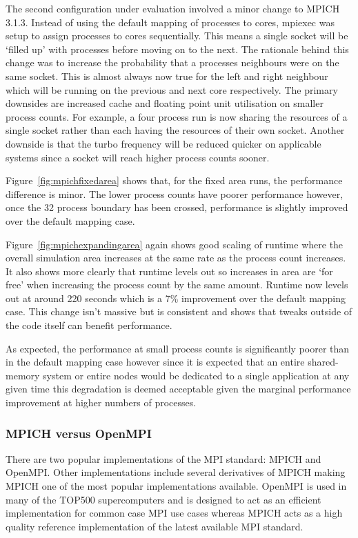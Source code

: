 The second configuration under evaluation involved a minor change to MPICH
3.1.3. Instead of using the default mapping of processes to cores, mpiexec was
setup to assign processes to cores sequentially. This means a single socket will
be `filled up' with processes before moving on to the next. The rationale behind
this change was to increase the probability that a processes neighbours were on
the same socket. This is almost always now true for the left and right neighbour
which will be running on the previous and next core respectively. The primary
downsides are increased cache and floating point unit utilisation on smaller
process counts. For example, a four process run is now sharing the resources of
a single socket rather than each having the resources of their own socket.
Another downside is that the turbo frequency will be reduced quicker on
applicable systems since a socket will reach higher process counts sooner.

Figure~\ref{fig:mpichfixedarea} shows that, for the fixed area runs, the
performance difference is minor. The lower process counts have poorer
performance however, once the 32 process boundary has been crossed, performance
is slightly improved over the default mapping case.

Figure~\ref{fig:mpichexpandingarea} again shows good scaling of
runtime where the overall simulation area increases at the same rate as the
process count increases. It also shows more clearly that runtime levels out so
increases in area are `for free' when increasing the process count by the same
amount. Runtime now levels out at around 220 seconds which is a 7\% improvement
over the default mapping case. This change isn't massive but is consistent and
shows that tweaks outside of the code itself can benefit performance.

As expected, the performance at small process counts is significantly poorer
than in the default mapping case however since it is expected that an entire
shared-memory system or entire nodes would be dedicated to a single application
at any given time this degradation is deemed acceptable given the marginal
performance improvement at higher numbers of processes.

\subsubsection{MPICH versus OpenMPI}

There are two popular implementations of the MPI standard: MPICH and OpenMPI.
Other implementations include several derivatives of MPICH making MPICH one of
the most popular implementations available. OpenMPI is used in many of the
TOP500 supercomputers and is designed to act as an efficient implementation for
common case MPI use cases whereas MPICH acts as a high quality reference
implementation of the latest available MPI standard.

